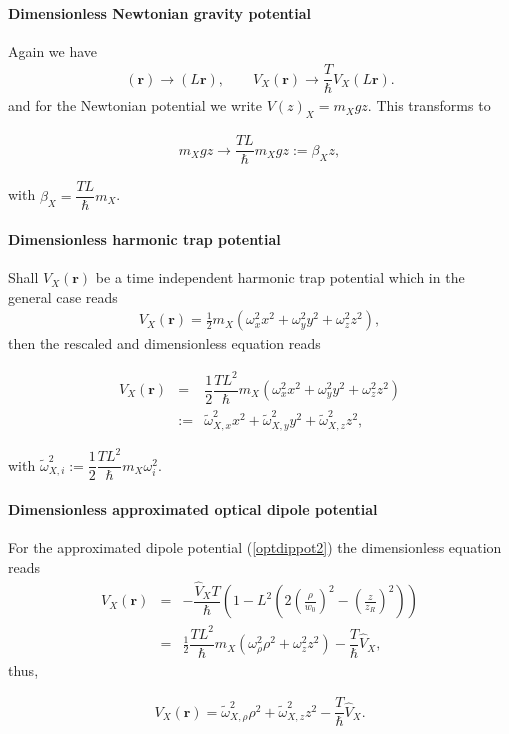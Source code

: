 \documentclass[12pt]{article}
\begin{document}
\paragraph{Dimensionless Newtonian gravity potential}
Again we have 
\begin{align}
(\mathbf{r}) \rightarrow (L\mathbf{r}), \qquad V_X(\mathbf{r}) \rightarrow \dfrac{T}{\hbar} V_X(L\mathbf{r}).
\end{align}
and for the Newtonian potential we write $V(z)_X= m_X g z$.
This transforms to 
\begin{center}
\begin{tcolorbox}
\begin{eqnarray}
m_Xgz\rightarrow \dfrac{T L}{\hbar} m_X g z :=\beta_X z,
\end{eqnarray}
\end{tcolorbox}
\end{center}
with $\beta_X=\dfrac{T L}{\hbar} m_X$.
\paragraph{Dimensionless harmonic trap potential}
Shall $V_X(\mathbf{r})$ be a time independent harmonic trap potential which in the general case reads
\begin{eqnarray}
 V_X(\mathbf{r})=\frac{1}{2} m_X \left(\omega^2_x x^2+\omega^2_y y^2+\omega^2_z z^2\right),
\end{eqnarray}
then the rescaled and dimensionless equation reads
\begin{center}
\begin{tcolorbox}
\begin{eqnarray}
V_X(\mathbf{r}) &=& \dfrac{1}{2}\dfrac{TL^2}{\hbar} m_X \left(\omega^2_x x^2+\omega^2_y y^2+\omega^2_z z^2\right)\\
&:=& \tilde{\omega}^2_{X,x} x^2+\tilde{\omega}^2_{X,y} y^2+\tilde{\omega}^2_{X,z} z^2,
\end{eqnarray}
\end{tcolorbox}
\end{center}
with $\tilde{\omega}^2_{X,i}:=\dfrac{1}{2}\dfrac{TL^2}{\hbar} m_X \omega^2_i$.
\paragraph{Dimensionless approximated optical dipole potential}
For the approximated dipole potential (\ref{optdippot2}) the dimensionless equation reads
\begin{eqnarray}
V_X(\mathbf{r}) & = & -\dfrac{\hat{V}_X T}{\hbar}\left(1-L^2\left(2\left(\frac{\rho}{w_0}\right)^2-\left(\frac{z}{z_R}\right)^2\right)\right)\\
& = & \frac{1}{2}\dfrac{TL^2}{\hbar}m_X\left(\omega_{\rho}^2 \rho^2+\omega_z^2 z^2\right)-\dfrac{T}{\hbar}\hat{V}_X, 
\end{eqnarray}
thus,
\begin{center}
\begin{tcolorbox}
\begin{eqnarray}
V_X(\mathbf{r}) =  \tilde{\omega}_{X,\rho}^2 \rho^2+\tilde{\omega}_{X,z}^2 z^2-\dfrac{T}{\hbar}\hat{V}_X.  
\end{eqnarray}
\end{tcolorbox}
\end{center}
\end{document}

